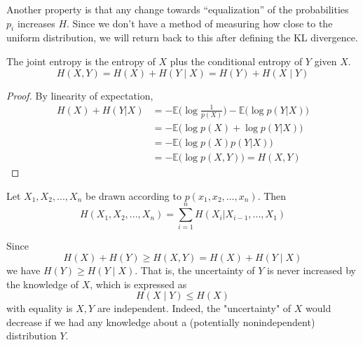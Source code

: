 \documentclass{article}
\begin{document}
    Another property is that any change towards ``equalization'' of the probabilities $p_i$ increases $H$. Since we don't have a method of measuring how close to the uniform distribution, we will return back to this after defining the KL divergence.  

    \begin{theorem}
      The joint entropy is the entropy of $X$ plus the conditional entropy of $Y$ given $X$. 
      \begin{equation}
        H(X, Y) = H(X) + H(Y \mid X) = H(Y) + H(X \mid Y)
      \end{equation}
    \end{theorem}
    \begin{proof}
      By linearity of expectation, 
      \begin{align*}
        H(X) + H(Y|X) & = - \mathbb{E} \Big( \log \frac{1}{p(X)}\Big) - \mathbb{E} \big( \log p(Y|X)\big) \\
        & = - \mathbb{E} \big( \log p(X) + \log p (Y|X) \big) \\
        & = - \mathbb{E} \big( \log p(X) p(Y|X)\big) \\
        & = - \mathbb{E} \big( \log p(X, Y) \big) = H(X, Y)
      \end{align*}
    \end{proof}

    \begin{corollary}
      Let $X_1, X_2, ..., X_n$ be drawn according to $p(x_1, x_2, ..., x_n)$. Then 
      \begin{equation}
        H(X_1, X_2, ..., X_n) = \sum_{i = 1}^n H(X_i | X_{i-1}, ..., X_1)
      \end{equation}
    \end{corollary}

    \begin{theorem}
      Since 
      \begin{equation}
        H(X) + H(Y) \geq H(X, Y) = H(X) + H(Y \mid X) 
      \end{equation}
      we have $H(Y) \geq H(Y \mid X)$. That is, the uncertainty of $Y$ is never increased by the knowledge of $X$, which is expressed as 
      \begin{equation}
        H(X \mid Y) \leq H(X)
      \end{equation}
      with equality is $X, Y$ are independent. Indeed, the "uncertainty" of $X$ would decrease if we had any knowledge about a (potentially nonindependent) distribution $Y$. 
    \end{theorem}
\end{document}
